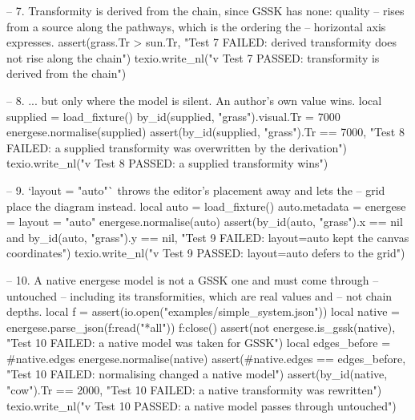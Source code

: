 \documentclass{article}
\begin{document}
\begin{luacode*}
    -- 7. Transformity is derived from the chain, since GSSK has none: quality
    --    rises from a source along the pathways, which is the ordering the
    --    horizontal axis expresses.
    assert(grass.Tr > sun.Tr, "Test 7 FAILED: derived transformity does not rise along the chain")
    texio.write_nl("v Test 7 PASSED: transformity is derived from the chain")

    -- 8. ... but only where the model is silent. An author's own value wins.
    local supplied = load_fixture()
    by_id(supplied, "grass").visual.Tr = 7000
    energese.normalise(supplied)
    assert(by_id(supplied, "grass").Tr == 7000,
           "Test 8 FAILED: a supplied transformity was overwritten by the derivation")
    texio.write_nl("v Test 8 PASSED: a supplied transformity wins")

    -- 9. `layout = "auto"` throws the editor's placement away and lets the
    --    grid place the diagram instead.
    local auto = load_fixture()
    auto.metadata = { energese = { layout = "auto" } }
    energese.normalise(auto)
    assert(by_id(auto, "grass").x == nil and by_id(auto, "grass").y == nil,
           "Test 9 FAILED: layout=auto kept the canvas coordinates")
    texio.write_nl("v Test 9 PASSED: layout=auto defers to the grid")

    -- 10. A native energese model is not a GSSK one and must come through
    --     untouched -- including its transformities, which are real values and
    --     not chain depths.
    local f = assert(io.open("examples/simple_system.json"))
    local native = energese.parse_json(f:read("*all"))
    f:close()
    assert(not energese.is_gssk(native), "Test 10 FAILED: a native model was taken for GSSK")
    local edges_before = #native.edges
    energese.normalise(native)
    assert(#native.edges == edges_before, "Test 10 FAILED: normalising changed a native model")
    assert(by_id(native, "cow").Tr == 2000, "Test 10 FAILED: a native transformity was rewritten")
    texio.write_nl("v Test 10 PASSED: a native model passes through untouched")
\end{luacode*}
\end{document}
